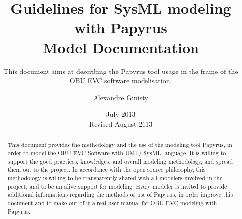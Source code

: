 \documentclass{template/openetcs_article}
\begin{document}
\frontmatter
{}




\title{Guidelines for SysML modeling with Papyrus \\ Model Documentation}

\subtitle{This document aims at describing the Papyrus tool usage in the frame of the OBU EVC software modelisation.}

\date{July 2013\\Revised August 2013}


\author{Alexandre Ginisty}






\begin{abstract}
This document provides the methodology and the use of the modeling tool Papyrus, in order to model the OBU EVC Software with UML/ SysML language.
It is willing to support the good practices, knowledges, and overall modeling methodology, and spread them out to the project. In accordance with the open source philosophy, this methodology is willing to be transparently shared with all modelers involved in the project, and to be an alive support for modeling. Every modeler is invited to provide additional informations regarding the methods or use of Papyrus, in order improve this document and to make out of it a real user manual for OBU EVC modeling with Papyrus.

\end{abstract}

\maketitle
\tableofcontents
\listoffiguresandtables
\newpage
\end{document}
